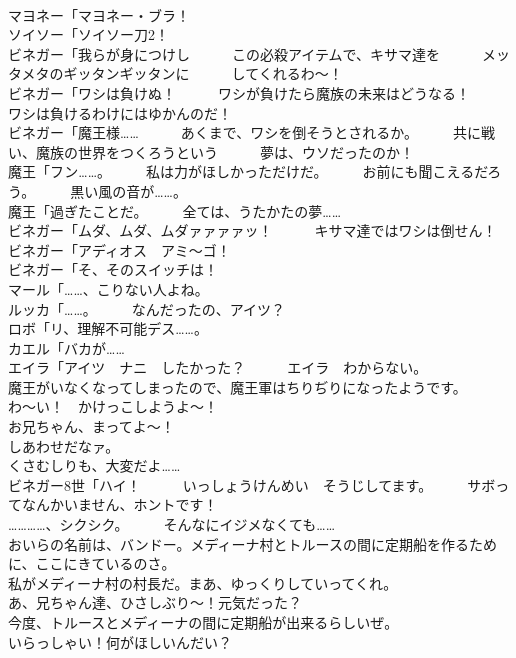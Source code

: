 \documentclass[8pt]{extreport}
\begin{document}
\begin{CJK}{UTF8}{min}
\\	マヨネー「マヨネー・ブラ！	
\\	ソイソー「ソイソー刀2！	
\\	ビネガー「我らが身につけし　　　この必殺アイテムで、キサマ達を　　　メッタメタのギッタンギッタンに　　　してくれるわ～！	
\\	ビネガー「ワシは負けぬ！　　　ワシが負けたら魔族の未来はどうなる！　　　ワシは負けるわけにはゆかんのだ！	
\\	ビネガー「魔王様……　　　あくまで、ワシを倒そうとされるか。　　　共に戦い、魔族の世界をつくろうという　　　夢は、ウソだったのか！	
\\	魔王「フン……。　　　私は力がほしかっただけだ。　　　お前にも聞こえるだろう。　　　黒い風の音が……。	
\\	魔王「過ぎたことだ。　　　全ては、うたかたの夢……	
\\	ビネガー「ムダ、ムダ、ムダァァァァッ！　　　キサマ達ではワシは倒せん！	
\\	ビネガー「アディオス　アミ～ゴ！	
\\	ビネガー「そ、そのスイッチは！	
\\	マール「……、こりない人よね。	
\\	ルッカ「……。　　　なんだったの、アイツ？	
\\	ロボ「リ、理解不可能デス……。	
\\	カエル「バカが……	
\\	エイラ「アイツ　ナニ　したかった？　　　エイラ　わからない。	
\\	魔王がいなくなってしまったので、魔王軍はちりぢりになったようです。	
\\	わ～い！　かけっこしようよ～！	
\\	お兄ちゃん、まってよ～！	
\\	しあわせだなァ。	
\\	くさむしりも、大変だよ……	
\\	ビネガー8世「ハイ！　　　いっしょうけんめい　そうじしてます。　　　サボってなんかいません、ホントです！	
\\	…………、シクシク。　　　そんなにイジメなくても……	
\\	おいらの名前は、バンドー。メディーナ村とトルースの間に定期船を作るために、ここにきているのさ。	
\\	私がメディーナ村の村長だ。まあ、ゆっくりしていってくれ。	
\\	あ、兄ちゃん達、ひさしぶり～！元気だった？ 
\\	今度、トルースとメディーナの間に定期船が出来るらしいぜ。	
\\	いらっしゃい！何がほしいんだい？	

\end{CJK}
\end{document}
